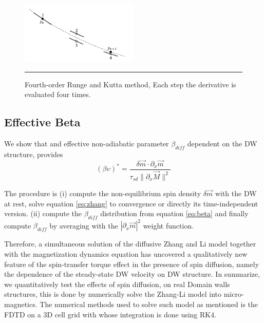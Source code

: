 \begin{figure}[htbp]
	\centering
		\includegraphics[width=0.5\textwidth]{Figures/rk4.png}
		\rule{35em}{0.5pt}
	\caption[Fourth-order Runge and Kutta Method]{Fourth-order Runge and Kutta method, Each step the derivative is evaluated four times. }
	\label{fig:kutta}
\end{figure}

\subsection{Effective Beta}

We show that and effective non-adiabatic parameter $\beta_{diff}$ dependent on the DW structure, provides 
\begin{equation} \label{eq:beta}
(\beta \upsilon)^{*} = \frac{\delta\vec{m} \cdot \partial_x \vec{m}}{\tau_{sd} \| \partial_x \vec{M} \|^2}
\end{equation}


The procedure is (i) compute the non-equilibrium spin density $\delta \vec{m}$ with the DW at rest, solve equation \ref{eq:zhang} to convergence or directly its time-independent version. (ii) compute the $\beta_{diff}$ distribution from equation \ref{eq:beta} and finally compute $\beta_{diff}$ by averaging with the $| \partial_x \vec{m}|^2$ weight function.


\vspace{3.5em}

Therefore, a simultaneous solution of the diffusive Zhang and Li model together with the magnetization dynamics equation has uncovered a qualitatively new feature of the spin-transfer torque effect in the presence of spin diffusion, namely the dependence of the steady-state DW velocity on DW structure. In summarize, we quantitatively test the effects of spin diffusion, on real Domain walls structures, this is done by numerically solve the Zhang-Li model into micro-magnetics. The numerical methods used to solve such model as mentioned is the FDTD on a 3D cell grid with whose integration is done using RK4.






